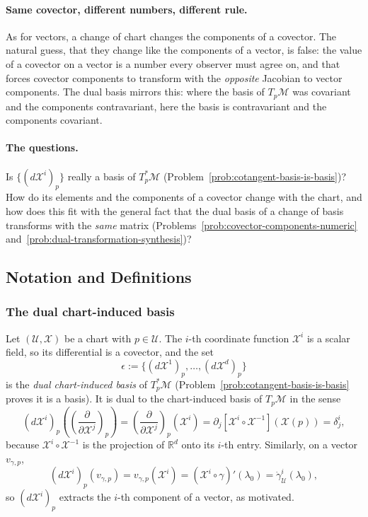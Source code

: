 \documentclass[11pt]{article}
\newcommand{\TpM}{T_p\mathcal M}
\newcommand{\TpsM}{T_p^*\mathcal M}
\begin{document}
\paragraph{Same covector, different numbers, different rule.}
As for vectors, a change of chart changes the components of a covector. The natural guess, that they change like the components of a vector, is false: the value of a covector on a vector is a number every observer must agree on, and that forces covector components to transform with the \emph{opposite} Jacobian to vector components. The dual basis mirrors this: where the basis of $\TpM$ was covariant and the components contravariant, here the basis is contravariant and the components covariant.

\paragraph{The questions.}
Is $\{(d\mathcal X^i)_p\}$ really a basis of $\TpsM$ (Problem~\ref{prob:cotangent-basis-is-basis})? How do its elements and the components of a covector change with the chart, and how does this fit with the general fact that the dual basis of a change of basis transforms with the \emph{same} matrix (Problems~\ref{prob:covector-components-numeric} and~\ref{prob:dual-transformation-synthesis})?

\subsection*{Notation and Definitions}

\subsubsection*{The dual chart-induced basis}
Let $(\mathcal U,\mathcal X)$ be a chart with $p\in\mathcal U$. The $i$-th coordinate function $\mathcal X^i$ is a scalar field, so its differential is a covector, and the set
\[
\epsilon:=\{(d\mathcal X^1)_p,\dots,(d\mathcal X^d)_p\}
\]
is the \emph{dual chart-induced basis} of $\TpsM$ (Problem~\ref{prob:cotangent-basis-is-basis} proves it is a basis). It is dual to the chart-induced basis of $\TpM$ in the sense
\[
(d\mathcal X^i)_p\!\left(\left(\frac{\partial}{\partial\mathcal X^j}\right)_p\right)=\left(\frac{\partial}{\partial\mathcal X^j}\right)_p(\mathcal X^i)=\partial_j[\mathcal X^i\circ\mathcal X^{-1}](\mathcal X(p))=\delta^i_j,
\]
because $\mathcal X^i\circ\mathcal X^{-1}$ is the projection of $\mathbb R^d$ onto its $i$-th entry. Similarly, on a vector $v_{\gamma,p}$,
\[
(d\mathcal X^i)_p(v_{\gamma,p})=v_{\gamma,p}(\mathcal X^i)=(\mathcal X^i\circ\gamma)'(\lambda_0)=\dot\gamma^i_{\mathcal U}(\lambda_0),
\]
so $(d\mathcal X^i)_p$ extracts the $i$-th component of a vector, as motivated.
\end{document}
